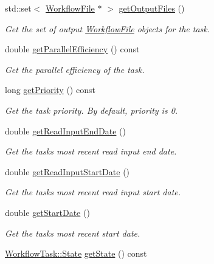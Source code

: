 \begin{DoxyCompactItemize}
std\+::set$<$ \hyperlink{classwrench_1_1_workflow_file}{Workflow\+File} $\ast$ $>$ \hyperlink{classwrench_1_1_workflow_task_ade05bf520e4cda9a4d7aeaa8ffaa5855}{get\+Output\+Files} ()
\begin{DoxyCompactList}\small\item\em Get the set of output \hyperlink{classwrench_1_1_workflow_file}{Workflow\+File} objects for the task. \end{DoxyCompactList}\item 
double \hyperlink{classwrench_1_1_workflow_task_ab7e3113ba73aebc6e2776a6e56984662}{get\+Parallel\+Efficiency} () const
\begin{DoxyCompactList}\small\item\em Get the parallel efficiency of the task. \end{DoxyCompactList}\item 
long \hyperlink{classwrench_1_1_workflow_task_a330d0b94f3958a6542ba8ce033448197}{get\+Priority} () const
\begin{DoxyCompactList}\small\item\em Get the task priority. By default, priority is 0. \end{DoxyCompactList}\item 
double \hyperlink{classwrench_1_1_workflow_task_a15bbd1fca442b459073164b52dcc44b0}{get\+Read\+Input\+End\+Date} ()
\begin{DoxyCompactList}\small\item\em Get the task\textquotesingle{}s most recent read input end date. \end{DoxyCompactList}\item 
double \hyperlink{classwrench_1_1_workflow_task_a752f0e9cf1bcab72e41de185931dbf9a}{get\+Read\+Input\+Start\+Date} ()
\begin{DoxyCompactList}\small\item\em Get the task\textquotesingle{}s most recent read input start date. \end{DoxyCompactList}\item 
double \hyperlink{classwrench_1_1_workflow_task_a17462dd156a6080653f96a1abbbb379d}{get\+Start\+Date} ()
\begin{DoxyCompactList}\small\item\em Get the task\textquotesingle{}s most recent start date. \end{DoxyCompactList}\item 
\hyperlink{classwrench_1_1_workflow_task_a1184f3d7aea21e1c87a9b17e84f1f92a}{Workflow\+Task\+::\+State} \hyperlink{classwrench_1_1_workflow_task_a990a3e96d944c37cb896a7ca0d84a4db}{get\+State} () const

\end{DoxyCompactItemize}
